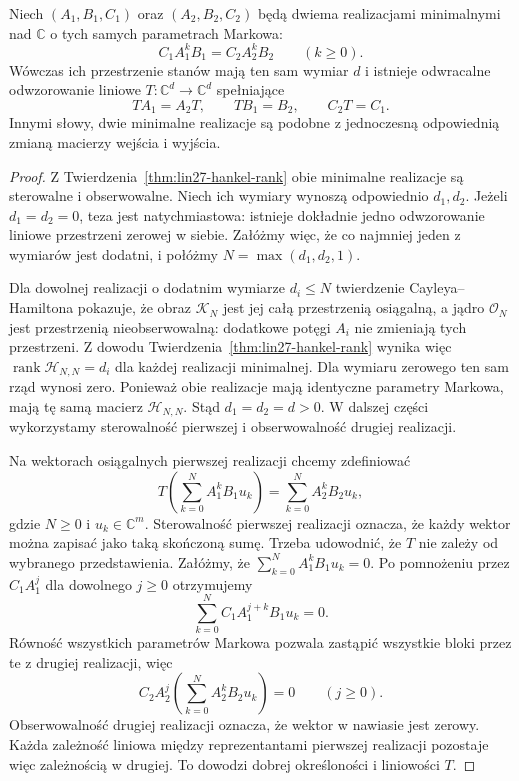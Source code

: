 \begin{twierdzenie}
\label{thm:lin27-minimal-uniqueness}
Niech
\((A_1,B_1,C_1)\)
oraz \((A_2,B_2,C_2)\)
będą dwiema
realizacjami minimalnymi
nad \(\mathbb C\)
o tych samych parametrach
Markowa:
\[
 C_1A_1^kB_1=C_2A_2^kB_2
 \qquad(k\ge0).
\]
Wówczas ich przestrzenie stanów
mają ten sam wymiar \(d\)
i istnieje odwracalne
odwzorowanie liniowe
\(T\colon\mathbb C^d\to\mathbb C^d\)
spełniające
\[
 TA_1=A_2T,\qquad
 TB_1=B_2,\qquad
 C_2T=C_1.
\]
Innymi słowy, dwie
minimalne realizacje
są podobne z jednoczesną
odpowiednią zmianą
macierzy wejścia i wyjścia.
\end{twierdzenie}
\begin{proof}
Z
Twierdzenia~\ref{thm:lin27-hankel-rank}
obie minimalne realizacje
są sterowalne i obserwowalne.
Niech ich wymiary wynoszą
odpowiednio \(d_1,d_2\).
Jeżeli \(d_1=d_2=0\),
teza jest natychmiastowa:
istnieje dokładnie jedno
odwzorowanie liniowe
przestrzeni zerowej w siebie.
Załóżmy więc, że co najmniej
jeden z wymiarów jest dodatni,
i połóżmy \(N=\max(d_1,d_2,1)\).

Dla dowolnej realizacji
o dodatnim wymiarze
\(d_i\le N\)
twierdzenie Cayleya--Hamiltona
pokazuje, że obraz
\(\mathcal K_N\) jest
jej całą przestrzenią osiągalną,
a jądro \(\mathcal O_N\)
jest przestrzenią nieobserwowalną:
dodatkowe potęgi \(A_i\)
nie zmieniają tych przestrzeni.
Z dowodu
Twierdzenia~\ref{thm:lin27-hankel-rank}
wynika więc
\(\operatorname{rank}\mathcal H_{N,N}=d_i\)
dla każdej realizacji minimalnej.
Dla wymiaru zerowego
ten sam rząd wynosi zero.
Ponieważ obie realizacje
mają identyczne parametry Markowa,
mają tę samą macierz
\(\mathcal H_{N,N}\).
Stąd \(d_1=d_2=d>0\).
W dalszej części wykorzystamy
sterowalność pierwszej
i obserwowalność drugiej
realizacji.

Na wektorach osiągalnych
pierwszej realizacji
chcemy zdefiniować
\[
 T\left(\sum_{k=0}^{N}
               A_1^kB_1u_k\right)
   =\sum_{k=0}^{N}A_2^kB_2u_k,
 \tag{27.1}\label{eq:lin27-map}
\]
gdzie \(N\ge0\)
i \(u_k\in\mathbb C^m\).
Sterowalność pierwszej
realizacji oznacza,
że każdy wektor
można zapisać
jako taką skończoną sumę.
Trzeba udowodnić,
że \(T\) nie zależy
od wybranego przedstawienia.
Załóżmy, że
\(\sum_{k=0}^{N}A_1^kB_1u_k=0\).
Po pomnożeniu przez
\(C_1A_1^j\)
dla dowolnego \(j\ge0\)
otrzymujemy
\[
 \sum_{k=0}^{N}
  C_1A_1^{j+k}B_1u_k=0.
\]
Równość wszystkich
parametrów Markowa
pozwala zastąpić
wszystkie bloki
przez te z drugiej
realizacji, więc
\[
 C_2A_2^j
 \left(\sum_{k=0}^{N}
       A_2^kB_2u_k\right)=0
 \qquad(j\ge0).
\]
Obserwowalność drugiej
realizacji oznacza,
że wektor w nawiasie
jest zerowy.
Każda zależność liniowa
między reprezentantami
pierwszej realizacji
pozostaje więc zależnością
w drugiej.
To dowodzi dobrej
określoności i liniowości \(T\).


\end{proof}
